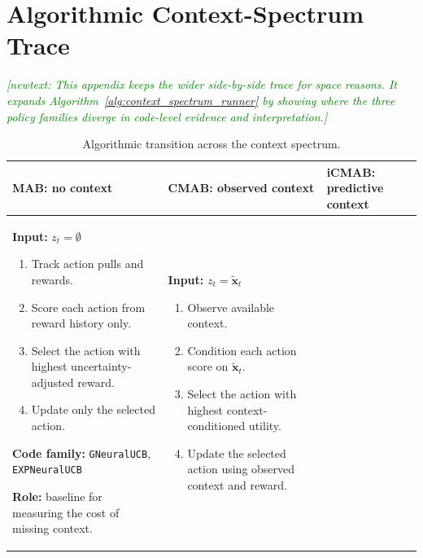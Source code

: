 \documentclass[conference]{IEEEtran}
\newcommand{\newtext}[1]{\textcolor{green}{{\it [newtext: #1]}}}
\begin{document}
\begin{table}[!t]
\section{Algorithmic Context-Spectrum Trace}
\label{app:algorithm_spectrum_trace}

\newtext{This appendix keeps the wider side-by-side trace for space reasons. It expands
Algorithm~\ref{alg:context_spectrum_runner} by showing where the three policy
families diverge in code-level evidence and interpretation.}

\caption{Algorithmic transition across the context spectrum.}
\label{tab:algorithm_context_trace}
\centering
\scriptsize
\setlength{\tabcolsep}{4pt}
\begin{tabular}{p{}p{}p{}}
\toprule
\textbf{MAB: no context} &
\textbf{CMAB: observed context} &
\textbf{iCMAB: predictive context} \\
\midrule

\begin{minipage}[t]{0.30\textwidth}
\textbf{Input:} $z_t=\emptyset$

\vspace{0.3em}
\begin{enumerate}
\setlength\itemsep{0.15em}
\item Track action pulls and rewards.
\item Score each action from reward history only.
\item Select the action with highest uncertainty-adjusted reward.
\item Update only the selected action.
\end{enumerate}

\textbf{Code family:}
\texttt{GNeuralUCB}, \texttt{EXPNeuralUCB}

\vspace{0.3em}
\textbf{Role:} baseline for measuring the cost of missing context.
\end{minipage}
&
\begin{minipage}[t]{0.30\textwidth}
\textbf{Input:} $z_t=\tilde{\mathbf{x}}_t$

\vspace{0.3em}
\begin{enumerate}
\setlength\itemsep{0.15em}
\item Observe available context.
\item Condition each action score on $\tilde{\mathbf{x}}_t$.
\item Select the action with highest context-conditioned utility.
\item Update the selected action using observed context and reward.
\end{enumerate}


\end{minipage}
\end{tabular}
\end{table}
\end{document}
